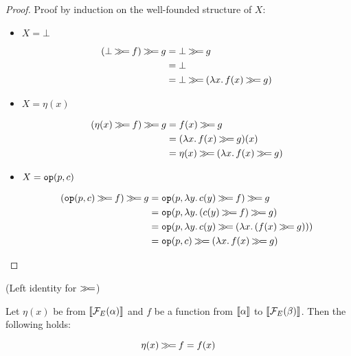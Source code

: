 \begin{proof}
  Proof by induction on the well-founded structure of $X$:
  
  \begin{itemize}
  \item $X = \bot$
    
    \vspace{-0.5cm}
    \begin{align*}
      (\bot \mathbin{\gg\!=} f) \mathbin{\gg\!=} g
      &= \bot \mathbin{\gg\!=} g \\
      &= \bot \\
      &= \bot \mathbin{\gg\!=} (\lambda x.\, f(x) \mathbin{\gg\!=} g)
    \end{align*}
    
  \item $X = \eta(x)$

    \vspace{-0.5cm}
    \begin{align*}
      (\eta(x) \mathbin{\gg\!=} f) \mathbin{\gg\!=} g
      &= f(x) \mathbin{\gg\!=} g \\
      &= (\lambda x.\, f(x) \mathbin{\gg\!=} g)(x) \\
      &= \eta(x) \mathbin{\gg\!=} (\lambda x.\, f(x) \mathbin{\gg\!=} g)
    \end{align*}
    
  \item $X = \mathtt{op}(p, c)$
    
    \vspace{-0.5cm}
    \begin{align*}
      (\op{op}(p, c) \hsbind f) \hsbind g
      &= \op{op}(p, \lam{y}{c(y) \hsbind f}) \hsbind g \\
      &= \op{op}(p, \lam{y}{(c(y) \hsbind f) \hsbind g}) \\
      &= \op{op}(p, \lam{y}{c(y) \hsbind (\lam{x}{(f(x) \hsbind g}))}) \\
      &= \op{op}(p, c) \hsbind (\lam{x}{f(x) \hsbind g})
    \end{align*}
  \end{itemize}
\end{proof}

\begin{law}\label{law:left-identity}
  (Left identity for $\mathbin{\gg\!=}$)
  
  Let $\eta(x)$ be from $\llbracket \mathcal{F}_E(\alpha) \rrbracket$ and $f$ be a function from
  $\llbracket \alpha \rrbracket$ to $\llbracket \mathcal{F}_E(\beta) \rrbracket$. Then the following holds:
  
  $$
  \eta(x) \mathbin{\gg\!=} f = f(x)
  $$
\end{law}

